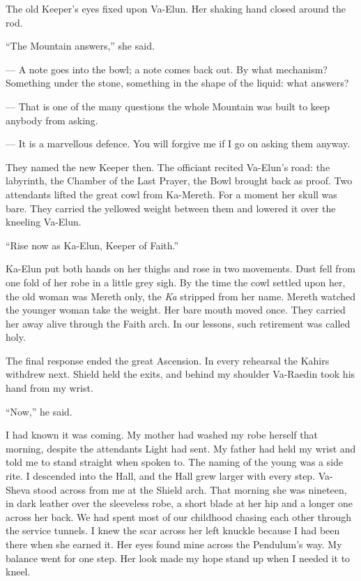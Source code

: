 The old Keeper's eyes fixed upon Va-Elun. Her shaking hand closed around the rod.\par

``The Mountain answers,'' she said.\par

\begin{room}

--- A note goes into the bowl; a note comes back out. By what mechanism? Something under the stone, something in the shape of the liquid: what answers?

--- That is one of the many questions the whole Mountain was built to keep anybody from asking.

--- It is a marvellous defence. You will forgive me if I go on asking them anyway.

\end{room}

They named the new Keeper then. The officiant recited Va-Elun's road: the labyrinth, the Chamber of the Last Prayer, the Bowl brought back as proof. Two attendants lifted the great cowl from Ka-Mereth. For a moment her skull was bare. They carried the yellowed weight between them and lowered it over the kneeling Va-Elun.\par

``Rise now as Ka-Elun, Keeper of Faith.''\par

Ka-Elun put both hands on her thighs and rose in two movements. Dust fell from one fold of her robe in a little grey sigh. By the time the cowl settled upon her, the old woman was Mereth only, the \textit{Ka} stripped from her name. Mereth watched the younger woman take the weight. Her bare mouth moved once. They carried her away alive through the Faith arch. In our lessons, such retirement was called holy.\par

\ornament

The final response ended the great Ascension. In every rehearsal the Kahirs withdrew next. Shield held the exits, and behind my shoulder Va-Raedin took his hand from my wrist.\par

``Now,'' he said.\par

I had known it was coming. My mother had washed my robe herself that morning, despite the attendants Light had sent. My father had held my wrist and told me to stand straight when spoken to. The naming of the young was a side rite. I descended into the Hall, and the Hall grew larger with every step. Va-Sheva stood across from me at the Shield arch. That morning she was nineteen, in dark leather over the sleeveless robe, a short blade at her hip and a longer one across her back. We had spent most of our childhood chasing each other through the service tunnels. I knew the scar across her left knuckle because I had been there when she earned it. Her eyes found mine across the Pendulum's way. My balance went for one step. Her look made my hope stand up when I needed it to kneel.\par

